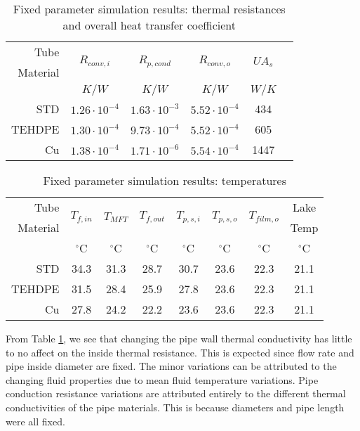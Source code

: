 \begin{table}[h]
	\centering
	\caption{Fixed parameter simulation results: thermal resistances and overall heat transfer coefficient}
	\label{tab:ExpResult:FinalData:FixedParams1}
	\begin{tabular}{r | c c c c c }
	\hline
	Tube & \multirow{2}{*}{$R_{conv,i}$} & \multirow{2}{*}{$R_{p,cond}$} & \multirow{2}{*}{$R_{conv,o}$} & \multirow{2}{*}{$UA_s$} \\
	Material & & & & \\
	\hline
	& $K/W$ & $K/W$ & $K/W$ & $W/K$  \\
	\hline\hline
	STD & $1.26 \cdot 10^{-4}$ & $1.63 \cdot 10^{-3}$ & $5.52 \cdot 10^{-4}$ & 434 \\
	\hline
	TEHDPE & $1.30 \cdot 10^{-4}$ & $9.73 \cdot 10^{-4}$ & $5.52 \cdot 10^{-4}$ &  605 \\
	\hline
	Cu & $1.38 \cdot 10^{-4}$ & $1.71 \cdot 10^{-6}$ & $5.54 \cdot 10^{-4}$ &  1447 \\
	\hline
	\end{tabular}
\end{table}

\begin{table}[h]
	\centering
	\caption{Fixed parameter simulation results: temperatures}
	\label{tab:ExpResult:FinalData:FixedParams2}
	\begin{tabular}{r | c c c | c c c c }
	\hline
	 Tube & \multirow{2}{*}{$T_{f,in}$} & \multirow{2}{*}{$T_{MFT}$} & \multirow{2}{*}{$T_{f,out}$} & \multirow{2}{*}{$T_{p,s,i}$} & \multirow{2}{*}{$T_{p,s,o}$} & \multirow{2}{*}{$T_{film,o}$} & Lake \\
	 Material & & & & & & & Temp \\
	\hline
	& $^\circ$C & $^\circ$C & $^\circ$C & $^\circ$C & $^\circ$C & $^\circ$C & $^\circ$C \\
	\hline\hline
	STD & 34.3 & 31.3 & 28.7 & 30.7 & 23.6 & 22.3 & 21.1 \\
	\hline
	TEHDPE & 31.5 & 28.4 & 25.9 & 27.8 & 23.6 & 22.3 & 21.1 \\
	\hline
	Cu & 27.8 & 24.2 & 22.2 & 23.6 & 23.6 & 22.3 & 21.1 \\
	\hline
	\end{tabular}
\end{table}

From Table \ref{tab:ExpResult:FinalData:FixedParams1}, we see that changing the pipe wall thermal conductivity has little to no affect on the inside thermal resistance. This is expected since flow rate and pipe inside diameter are fixed. The minor variations can be attributed to the changing fluid properties due to mean fluid temperature variations. Pipe conduction resistance variations are attributed entirely to the different thermal conductivities of the pipe materials. This is because diameters and pipe length were all fixed. 


